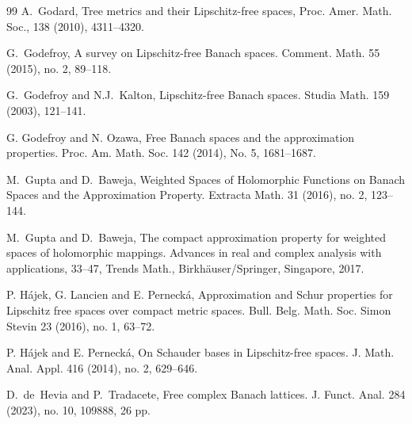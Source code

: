 \documentclass[12pt,leqno]{amsart}
\numberwithin{equation}{section} %
\theoremstyle{definition}
\numberwithin{equation}{section}
\begin{document}
\begin{thebibliography}{99}
A.~Godard, Tree metrics and their {L}ipschitz-free spaces, Proc. Amer. Math. Soc., 138 (2010), 4311--4320.
  
   G.~Godefroy, A survey on Lipschitz-free Banach spaces. Comment. Math. 55 (2015), no. 2, 89--118. 
   
   G.~Godefroy and N.J.~Kalton,  Lipschitz-free Banach spaces. Studia Math. 159 (2003), 121--141.

G. Godefroy and N. Ozawa, Free Banach spaces and the approximation properties. Proc. Am. Math. Soc. 142 (2014), No. 5, 1681--1687. 
   
M.~Gupta and D.~Baweja, Weighted Spaces of Holomorphic Functions on Banach Spaces and the Approximation Property. Extracta Math. 31 (2016), no. 2, 123--144.

M.~Gupta and D.~Baweja, The compact approximation property for weighted spaces of holomorphic mappings. Advances in real and complex analysis with applications, 33--47, Trends Math., Birkh\"auser/Springer, Singapore, 2017.

 P. H\'ajek, G. Lancien and E. Perneck\'a, Approximation and Schur properties for Lipschitz free spaces over compact metric spaces. Bull. Belg. Math. Soc. Simon Stevin 23 (2016), no. 1, 63--72. 

 P. H\'ajek and E. Perneck\'a, On Schauder bases in Lipschitz-free spaces. J. Math. Anal. Appl. 416 (2014), no. 2, 629--646. 

 D.~de~Hevia and P.~Tradacete, Free complex Banach lattices. J. Funct. Anal. 284 (2023), no. 10, 109888, 26 pp.



 
 
 
 

\end{thebibliography}
\end{document}
